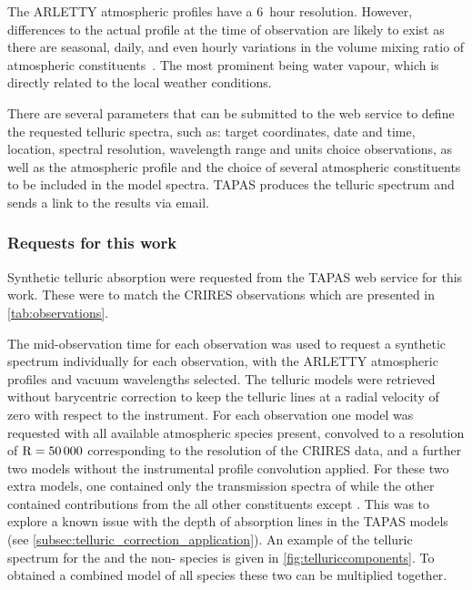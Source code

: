 The {ARLETTY} atmospheric profiles have a 6~hour resolution.
However, differences to the actual profile at the time of observation are likely to exist as there are seasonal, daily, and even hourly variations in the volume mixing ratio of atmospheric constituents~\citep[e.g.][]{ramanathan_daily_1953, thoning_atmospheric_1989, schneising_three_2009}.
The most prominent being water vapour, which is directly related to the local weather conditions.

There are several parameters that can be submitted to the web service to define the requested telluric spectra, such as: target coordinates, date and time, location, spectral resolution, wavelength range and units choice observations, as well as the atmospheric profile and the choice of several atmospheric constituents to be included in the model spectra.
{TAPAS} produces the telluric spectrum and sends a link to the results via email.


\subsubsection{Requests for this work}
Synthetic telluric absorption were requested from the {TAPAS} web service for this work.
These were to match the {CRIRES} observations which are presented in \cref{tab:observations}.

The mid-observation time for each observation was used to request a synthetic spectrum individually for each observation, with the {ARLETTY} atmospheric profiles and vacuum wavelengths selected.
The telluric models were retrieved without barycentric correction to keep the telluric lines at a radial velocity of zero with respect to the instrument.
For each observation one model was requested with all available atmospheric species present, convolved to a resolution of \(\rm R=50\,000\) corresponding to the resolution of the CRIRES data, and a further two models without the instrumental profile convolution applied.
For these two extra models, one contained only the transmission spectra of  while the other contained contributions from the all other constituents except .
This was to explore a known issue with the depth of  absorption lines in the {TAPAS} models~\citep{bertaux_tapas_2014} (see \cref{subsec:telluric_correction_application}).
An example of the telluric spectrum for the  and the non- species is given in \cref{fig:telluriccomponents}.
To obtained a combined model of all species these two can be multiplied together.

